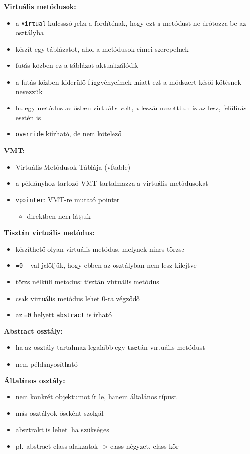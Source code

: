 \textbf{Virtuális metódusok:}
\begin{itemize}
    \item a \texttt{virtual} kulcsszó jelzi a fordítónak, hogy ezt a metódust ne drótozza be az osztályba
    \item készít egy táblázatot, ahol a metódusok címei szerepelnek
    \item futás közben ez a táblázat aktualizálódik
    \item a futás közben kiderülő függvénycímek miatt ezt a módszert késői kötésnek nevezzük
    \item ha egy metódus az ősben virtuális volt, a leszármazottban is az lesz, felülírás esetén is
    \item \texttt{override} kiírható, de nem kötelező
\end{itemize}

\textbf{VMT:}
\begin{itemize}
    \item Virtuális Metódusok Táblája (vftable)
    \item a példányhoz tartozó VMT tartalmazza a virtuális metódusokat
    \item \texttt{vpointer}: VMT-re mutató pointer
    \begin{itemize}
        \item direktben nem látjuk
    \end{itemize}
\end{itemize}

\textbf{Tisztán virtuális metódus:}
\begin{itemize}
    \item készíthető olyan virtuális metódus, melynek nincs törzse
    \item \texttt{=0} -- val jelöljük, hogy ebben az osztályban nem lesz kifejtve
    \item törzs nélküli metódus: tisztán virtuális metódus
    \item csak virtuális metódus lehet 0-ra végződő
    \item az \texttt{=0} helyett \texttt{abstract} is írható
\end{itemize}

\textbf{Abstract osztály:}
\begin{itemize}
    \item ha az osztály tartalmaz legalább egy tisztán virtuális metódust
    \item nem példányosítható
\end{itemize}

\textbf{Általános osztály:}
\begin{itemize}
    \item nem konkrét objektumot ír le, hanem általános típust
    \item más osztályok őseként szolgál
    \item absztrakt is lehet, ha szükséges
    \item pl.\ abstract class alakzatok -> class négyzet, class kör
\end{itemize}